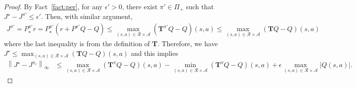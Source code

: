 \documentclass{article}
\theoremstyle{definition}
\theoremstyle{remark}
\newcommand{\cA}{\mathcal{A}}
\newcommand{\cR}{\mathcal{R}}
\newcommand{\T}{\mathbf{T}}
\newcommand*{\infn}[1]{\left\|{#1}\right\|_{\infty}}
\begin{document}
\begin{proof}
By Fact~\ref{fact:per}, for any $\epsilon'>0$, there exist $\pi' \in \Pi_+$ such that $J^\star-J^{\pi'} \le \epsilon'$. Then, with similar argument,
\begin{align*}
    J^{\pi'} = P^{\pi'}_\star r = P^{\pi'}_\star (r+P^{\pi'} Q-Q) \le \max_{(s,a) \in \cR \times \cA} {(\T^{\pi'} Q-Q)(s,a)} \le \max_{(s,a) \in \cR \times \cA} {(\T Q-Q)(s,a)} 
\end{align*}
where the last inequality is from the definition of $\T$. Therefore,  we have $    J^{\star} \le   \max_{(s,a) \in \cR \times \cA} {(\T Q-Q)(s,a)}$ and this implies
\begin{align*}
    \infn{J^\star-J^{\pi_\epsilon}} &\le \max_{(s,a) \in \cR \times \cA} {(\T^{\pi} Q-Q)(s,a)}-\min_{(s,a) \in \cR \times \cA} {(\T^{\pi} Q-Q)(s,a)} +  \epsilon \max_{(s,a) \in \cR \times \cA}|Q(s,a)|.
\end{align*}
\end{proof}
\end{document}
